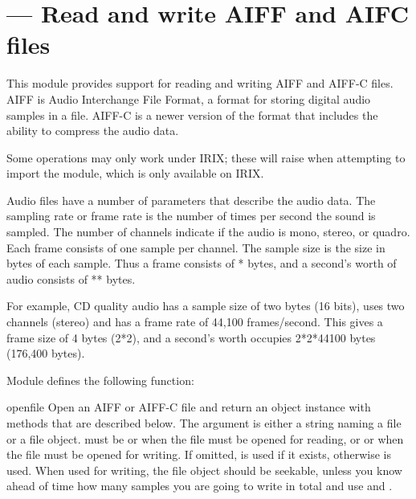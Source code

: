 \section{ ---
         Read and write AIFF and AIFC files}



This module provides support for reading and writing AIFF and AIFF-C
files.  AIFF is Audio Interchange File Format, a format for storing
digital audio samples in a file.  AIFF-C is a newer version of the
format that includes the ability to compress the audio data.

  Some operations may only work under IRIX; these will
raise  when attempting to import the
 module, which is only available on IRIX.

Audio files have a number of parameters that describe the audio data.
The sampling rate or frame rate is the number of times per second the
sound is sampled.  The number of channels indicate if the audio is
mono, stereo, or quadro.  Each frame consists of one sample per
channel.  The sample size is the size in bytes of each sample.  Thus a
frame consists of * bytes, and a
second's worth of audio consists of
** bytes.

For example, CD quality audio has a sample size of two bytes (16
bits), uses two channels (stereo) and has a frame rate of 44,100
frames/second.  This gives a frame size of 4 bytes (2*2), and a
second's worth occupies 2*2*44100 bytes (176,400 bytes).

Module  defines the following function:

\begin{funcdesc}{open}{file}
Open an AIFF or AIFF-C file and return an object instance with
methods that are described below.  The argument  is either a
string naming a file or a file object.   must be 
or  when the file must be opened for reading, or  
or  when the file must be opened for writing.  If omitted,
 is used if it exists, otherwise  is
used.  When used for writing, the file object should be seekable,
unless you know ahead of time how many samples you are going to write
in total and use  and .
\end{funcdesc}

